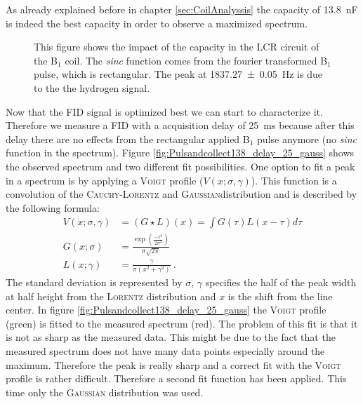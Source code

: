 As already explained before in chapter \ref{sec:CoilAnalyssis} the capacity of \SI{13.8}{\nano \farad} is indeed the best capacity in order to observe a maximized spectrum.
\begin{figure}[H]
    \centering
    
    \caption[This figure shows the impact of the capacity in the LCR circuit of the B$_1$ coil.]{This figure shows the impact of the capacity in the LCR circuit of the B$_1$ coil.
    The \textit{sinc} function comes from the fourier transformed B$_1$ pulse, which is rectangular.
    The peak at \SI{1837.27 \pm 0.05}{\hertz} is due to the the hydrogen signal.}
    \label{fig:Pulsandcollect}
\end{figure}
Now that the FID signal is optimized best we can start to characterize it.
Therefore we measure a FID with a acquisition delay of \SI{25}{\milli \second} because after this delay there are no effects from the rectangular applied B$_1$ pulse anymore (no \textit{sinc} function in the spectrum).
Figure \ref{fig:Pulsandcollect138_delay_25_gauss} shows the observed spectrum and two different fit possibilities.\newline
One option to fit a peak in a spectrum is by applying a \textsc{Voigt} profile ($V(x;\sigma , \gamma)$).
This function is a convolution of the \textsc{Cauchy-Lorentz} and \textsc{Gaussian}distribution and is described by the following formula:
\begin{align}
    V(x;\sigma , \gamma) &= ( G \star L)(x) = \int G(\tau) L(x-\tau) d\tau \\
    G(x;\sigma) &= \frac{\exp\left(\frac{-x^2}{2\sigma^2}\right)}{\sigma \sqrt{2 \pi}} \\
    L(x;\gamma)  &= \frac{\gamma}{\pi \left( x^2+\gamma^2\right)} \ .
    \label{eq: voigt} 
\end{align}
The standard deviation is represented by $\sigma$, $\gamma$ specifies the half of the peak width at half height from the \textsc{Lorentz} distribution and $x$ is the shift from the line center.
In figure \ref{fig:Pulsandcollect138_delay_25_gauss} the \textsc{Voigt} profile (green) is fitted to the measured spectrum (red).
The problem of this fit is that it is not as sharp as the measured data.
This might be due to the fact that the measured spectrum does not have many data points especially around the maximum.
Therefore the peak is really sharp and a correct fit with the \textsc{Voigt} profile is rather difficult.
Therefore a second fit function has been applied.
This time only the \textsc{Gaussian} distribution was used.
